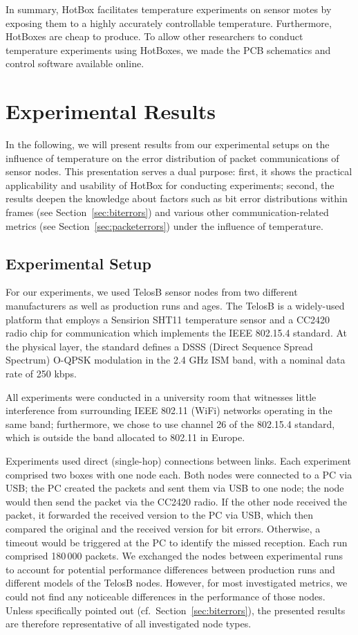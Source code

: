 \documentclass[color]{aib}
\begin{document}
In summary, HotBox facilitates temperature experiments on sensor motes by exposing them to a highly accurately controllable temperature.
Furthermore, HotBoxes are cheap to produce.
To allow other researchers to conduct temperature experiments using HotBoxes, we made the PCB schematics and control software available online\cite{hotbox-sources}.

\section{Experimental Results}
\label{sec:experiments}

In the following, we will present results from our experimental setups on the influence of temperature on the error distribution of packet communications of sensor nodes.
This presentation serves a dual purpose: first, it shows the practical applicability and usability of HotBox for conducting experiments; second, the results deepen the knowledge about factors such as bit error distributions within frames (see Section~\ref{sec:biterrors}) and various other communication-related metrics (see Section~\ref{sec:packeterrors}) under the influence of temperature.

\subsection{Experimental Setup}

For our experiments, we used TelosB sensor nodes from two different manufacturers as well as production runs and ages.
The TelosB is a widely-used platform that employs a Sensirion SHT11\cite{sensirion} temperature sensor and a CC2420\cite{cc2420} radio chip for communication which implements the IEEE 802.15.4 standard\cite{ieee802154}.
At the physical layer, the standard defines a DSSS (Direct Sequence Spread Spectrum) O-QPSK modulation in the 2.4 GHz ISM band, with a nominal data rate of 250 kbps.

All experiments were conducted in a university room that witnesses little interference from surrounding IEEE 802.11 (WiFi) networks operating in the same band; furthermore, we chose to use channel 26 of the 802.15.4 standard, which is outside the band allocated to 802.11 in Europe.

Experiments used direct (single-hop) connections between links.
Each experiment comprised two boxes with one node each.
Both nodes were connected to a PC via USB; the PC created the packets and sent them via USB to one node; the node would then send the packet via the CC2420 radio.
If the other node received the packet, it forwarded the received version to the PC via USB, which then compared the original and the received version for bit errors.
Otherwise, a timeout would be triggered at the PC to identify the missed reception.
Each run comprised 180\,000 packets.
We exchanged the nodes between experimental runs to account for potential performance differences between production runs and different models of the TelosB nodes.
However, for most investigated metrics, we could not find any noticeable differences in the performance of those nodes. Unless specifically pointed out (cf.\ Section~\ref{sec:biterrors}), the presented results are therefore representative of all investigated node types.
\end{document}
